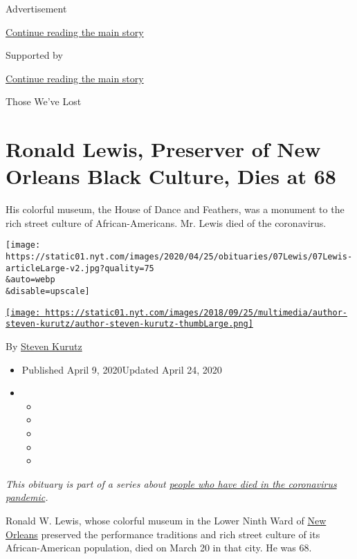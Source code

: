 Advertisement

\protect\hyperlink{after-top}{Continue reading the main story}

Supported by

\protect\hyperlink{after-sponsor}{Continue reading the main story}

Those We've Lost

\hypertarget{ronald-lewis-preserver-of-new-orleans-black-culture-dies-at-68}{%
\section{Ronald Lewis, Preserver of New Orleans Black Culture, Dies at
68}\label{ronald-lewis-preserver-of-new-orleans-black-culture-dies-at-68}}

His colorful museum, the House of Dance and Feathers, was a monument to
the rich street culture of African-Americans. Mr. Lewis died of the
coronavirus.

\texttt{[image: https://static01.nyt.com/images/2020/04/25/obituaries/07Lewis/07Lewis-articleLarge-v2.jpg?quality=75\\\&auto=webp\\\&disable=upscale]}

\href{https://www.nytimes.com/by/steven-kurutz}{\texttt{[image: https://static01.nyt.com/images/2018/09/25/multimedia/author-steven-kurutz/author-steven-kurutz-thumbLarge.png]}}

By \href{https://www.nytimes.com/by/steven-kurutz}{Steven Kurutz}

\begin{itemize}
\item
  Published April 9, 2020Updated April 24, 2020
\item
  \begin{itemize}
  \item
  \item
  \item
  \item
  \item
  \end{itemize}
\end{itemize}

\emph{This obituary is part of a series about}
\href{https://www.nytimes.com/series/people-who-have-died-of-the-coronavirus}{\emph{people
who have died in the coronavirus pandemic}}\emph{.}

Ronald W. Lewis, whose colorful museum in the Lower Ninth Ward of
\href{https://www.nytimes.com/2020/04/13/us/coronavirus-new-orleans-mardi-gras.html}{New
Orleans} preserved the performance traditions and rich street culture of
its African-American population, died on March 20 in that city. He was
68.

